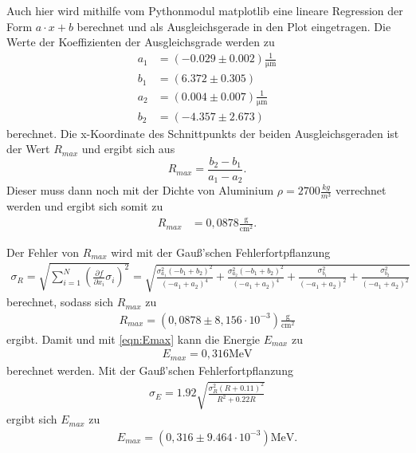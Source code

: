 Auch hier wird mithilfe vom Pythonmodul matplotlib \cite{matplotlib} eine lineare Regression der Form $a \cdot x + b$ berechnet und 
als Ausgleichsgerade in den Plot eingetragen. 
Die Werte der Koeffizienten der Ausgleichsgrade werden zu
\begin{align*}
  a_1 &= (-0.029 \pm 0.002) \frac{1}{\si{\micro\meter}}\\
  b_1 &= (6.372 \pm 0.305) \\
  a_2 &= (0.004 \pm 0.007) \frac{1}{\si{\micro\meter}}\\
  b_2 &= (-4.357 \pm 2.673)
\end{align*}
berechnet.
Die x-Koordinate des Schnittpunkts der beiden Ausgleichsgeraden ist der Wert $R_{max}$ und ergibt
sich aus
\begin{equation}
  R_{max} =  \frac{b_2 - b_1}{a_1 - a_2}.
  \label{eqn:Rmax}
\end{equation}
Dieser muss dann noch mit der Dichte von Aluminium $\rho = 2700 \frac{kg}{m^3}$\cite{AlDichte} verrechnet werden und ergibt sich somit zu
\begin{align}
  R_{max} &= 0,0878 \frac{\si{\g}}{\si{\centi\meter^2}}.
\end{align}

Der Fehler von $R_{max}$ wird mit der Gauß'schen Fehlerfortpflanzung 
\begin{align*}
  \sigma_R = \sqrt{
      \sum\limits_{i = 1}^N
       \left( \frac{\partial f}{\partial x_i} \sigma_i \right)^{\!\! 2}
     }
     =\sqrt{\frac{\sigma_{a_{1}}^{2} \left(- b_{1} + b_{2}\right)^{2}}{\left(- a_{1} + a_{2}\right)^{4}}
  + \frac{\sigma_{a_{2}}^{2} \left(- b_{1} + b_{2}\right)^{2}}{\left(- a_{1} + a_{2}\right)^{4}} + \frac{\sigma_{b_{1}}^{2}}{\left(- a_{1}
  + a_{2}\right)^{2}} + \frac{\sigma_{b_{2}}^{2}}{\left(- a_{1} + a_{2}\right)^{2}}}
\end{align*}
berechnet, sodass sich $R_{max}$ zu
\begin{align}
  R_{max}= (0,0878 \pm 8,156 \cdot 10^{-3}) \frac{\si{\g}}{\si{\centi\meter^2}}
\end{align}
ergibt. Damit und mit \autoref{eqn:Emax} kann die Energie $E_{max}$ zu
\begin{align}
  E_{max}= 0,316 \si{\mega\eV}
\end{align}
berechnet werden.
Mit der Gauß'schen Fehlerfortpflanzung
\begin{align*}
  \sigma_E =1.92 \sqrt{\frac{\sigma_{R}^{2} \left(R + 0.11\right)^{2}}{R^{2} + 0.22 R}}
\end{align*}
ergibt sich $E_{max}$ zu
\begin{align}
  E_{max}= (0,316 \pm 9.464 \cdot 10^{-3}) \si{\mega\eV}.
\end{align}